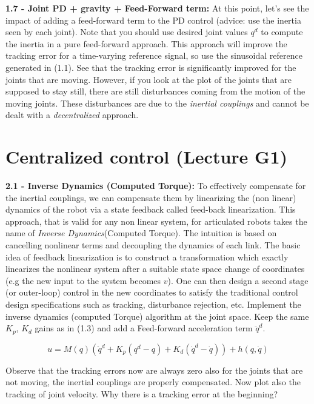 \documentclass[11pt]{article}
\begin{document}
\noindent
\textbf{1.7 - Joint  PD + gravity + Feed-Forward term:}
At this point, let's see the impact of adding a feed-forward term to the PD control (advice: use the inertia seen by each joint). Note that you should use desired joint values $q^d$ to compute the inertia in a pure feed-forward approach. This approach will improve the tracking error for a time-varying reference signal, so use the sinusoidal reference generated in (1.1).  See that the tracking error is significantly improved for the joints that are moving. However, if you look at the plot of the joints that are supposed to stay still, there are still disturbances coming from the motion of the moving joints. These disturbances are  due to the \textit{inertial couplings} and cannot be dealt with a \textit{decentralized} approach.

\quad

\section{Centralized control (Lecture G1)}

\noindent
\textbf{2.1 - Inverse Dynamics (Computed Torque):}
To effectively compensate for the inertial couplings, we can compensate them by 
linearizing the (non linear) dynamics of the robot via a state feedback called feed-back linearization. 
This approach, that is valid for any non linear system, for articulated robots takes the name of \textit{Inverse Dynamics}(Computed Torque). 
The intuition is based on cancelling nonlinear terms and decoupling the dynamics of each link.
The basic idea of feedback linearization is to construct a transformation which exactly linearizes the
nonlinear system after a suitable state space change of coordinates (e.g the new input to the system becomes $v$).
 One can then design a second stage (or outer-loop) control in the new coordinates to satisfy the traditional control design specifications such as tracking,
disturbance rejection, etc.
Implement the inverse dynamics  (computed Torque) algorithm at the joint space. Keep the same $K_p$, $K_d$ gains as in (1.3) and add a Feed-forward acceleration term $\ddot{q}^d$. 

\begin{equation*}
u = M(q) (\ddot{q}^d + K_{p} (q^d  - q) + K_{d} (\dot{q}^d  - \dot{q})) + h(q,\dot{q})
\end{equation*}

Observe that the tracking errors  now are  always zero also for the joints that are not moving, 
the inertial couplings are properly compensated. 
Now plot also the tracking of joint velocity. Why there is a tracking error at the beginning? 
\end{document}
